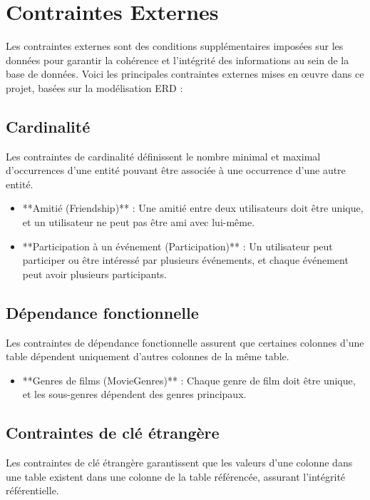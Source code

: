 \section{Contraintes Externes}

Les contraintes externes sont des conditions supplémentaires imposées sur les données pour garantir la cohérence et l'intégrité des informations au sein de la base de données. Voici les principales contraintes externes mises en œuvre dans ce projet, basées sur la modélisation ERD :

\subsection*{Cardinalité}

Les contraintes de cardinalité définissent le nombre minimal et maximal d'occurrences d'une entité pouvant être associée à une occurrence d'une autre entité.

\begin{itemize}
    \item **Amitié (Friendship)** : Une amitié entre deux utilisateurs doit être unique, et un utilisateur ne peut pas être ami avec lui-même.
    \item **Participation à un événement (Participation)** : Un utilisateur peut participer ou être intéressé par plusieurs événements, et chaque événement peut avoir plusieurs participants.
\end{itemize}

\subsection*{Dépendance fonctionnelle}

Les contraintes de dépendance fonctionnelle assurent que certaines colonnes d'une table dépendent uniquement d'autres colonnes de la même table.

\begin{itemize}
    \item **Genres de films (MovieGenres)** : Chaque genre de film doit être unique, et les sous-genres dépendent des genres principaux.
\end{itemize}

\subsection*{Contraintes de clé étrangère}

Les contraintes de clé étrangère garantissent que les valeurs d'une colonne dans une table existent dans une colonne de la table référencée, assurant l'intégrité référentielle.

